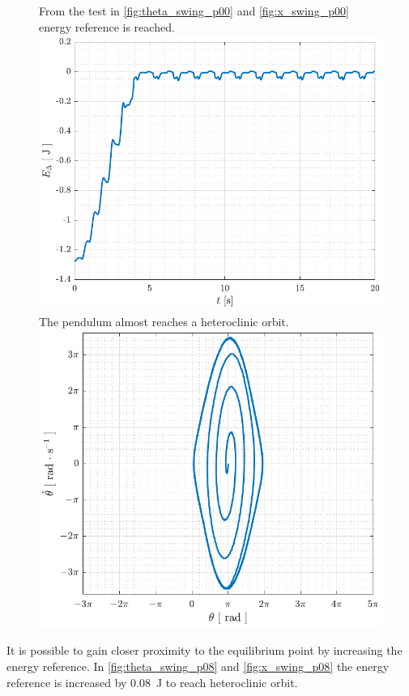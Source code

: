 \begin{figure}[H]
  \hspace{1cm}
  \captionbox
  {
    From the test in \autoref{fig:theta_swing_p00} and \ref{fig:x_swing_p00} energy reference is reached.
    \label{fig:Edelta_swing_p00}
  }
  {
    \hspace{-1cm}
    \includegraphics[width=.4\textwidth]{figures/Edelta_swing_p00}
  }
  \hspace{20pt}
  \captionbox 
  {
    The pendulum almost reaches a heteroclinic orbit.
    \label{fig:phase_swing_p00}
  }
  {
    \hspace{-1cm}
    \includegraphics[width=.364\textwidth]{figures/phase_swing_p00}
  }  
\end{figure}
%
%
It is possible to gain closer proximity to the equilibrium point by increasing the energy reference. In \autoref{fig:theta_swing_p08} and \ref{fig:x_swing_p08} the energy reference is increased by \SI{0.08}{J} to reach heteroclinic orbit.
%
%
%
